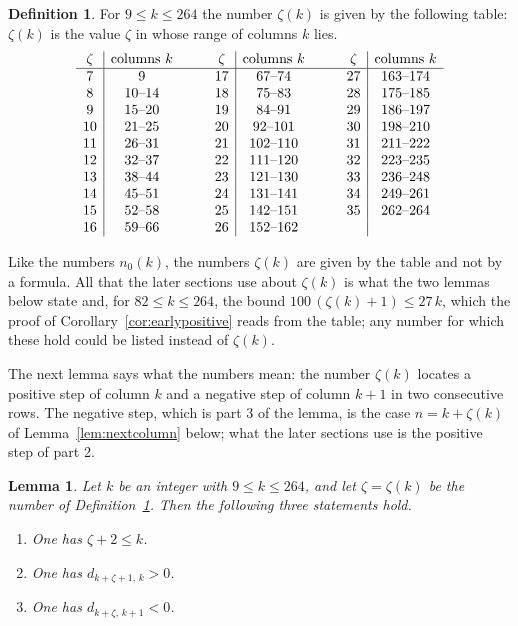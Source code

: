 \documentclass{amsart}
\newtheorem{lemma}[theorem]{Lemma}
\theoremstyle{definition}
\newtheorem{definition}[theorem]{Definition}
\theoremstyle{remark}
\numberwithin{equation}{section}
\begin{document}
\begin{definition}\label{def:zeta}
For $9\le k\le264$ the number $\zeta(k)$ is given by the following table:
$\zeta(k)$ is the value $\zeta$ in whose range of columns $k$ lies.
\[
\begin{array}{c|c@{\qquad\quad}c|c@{\qquad\quad}c|c}
\zeta & \text{columns $k$} & \zeta & \text{columns $k$} & \zeta
 & \text{columns $k$}\\
\hline
7 & 9 & 17 & 67\text{--}74 & 27 & 163\text{--}174\\
8 & 10\text{--}14 & 18 & 75\text{--}83 & 28 & 175\text{--}185\\
9 & 15\text{--}20 & 19 & 84\text{--}91 & 29 & 186\text{--}197\\
10 & 21\text{--}25 & 20 & 92\text{--}101 & 30 & 198\text{--}210\\
11 & 26\text{--}31 & 21 & 102\text{--}110 & 31 & 211\text{--}222\\
12 & 32\text{--}37 & 22 & 111\text{--}120 & 32 & 223\text{--}235\\
13 & 38\text{--}44 & 23 & 121\text{--}130 & 33 & 236\text{--}248\\
14 & 45\text{--}51 & 24 & 131\text{--}141 & 34 & 249\text{--}261\\
15 & 52\text{--}58 & 25 & 142\text{--}151 & 35 & 262\text{--}264\\
16 & 59\text{--}66 & 26 & 152\text{--}162 & &
\end{array}
\]
\end{definition}

Like the numbers $n_0(k)$, the numbers $\zeta(k)$ are given by the
table and not by a formula. All that the later sections use about
$\zeta(k)$ is what the two lemmas below state and, for $82\le k\le264$, the
bound $100\,(\zeta(k)+1)\le27\,k$, which the proof of
Corollary~\ref{cor:earlypositive} reads from the table; any number for
which these hold could be listed instead of $\zeta(k)$.

The next lemma
says what the numbers mean: the number $\zeta(k)$
locates a positive step of column $k$ and a negative step of column $k+1$
in two consecutive rows. The negative step, which is part 3 of the lemma,
is the case $n=k+\zeta(k)$ of Lemma~\ref{lem:nextcolumn} below; what the
later sections use is the positive step of part 2.

\begin{lemma}\label{lem:signpair}
Let $k$ be an integer with $9\le k\le264$, and let $\zeta=\zeta(k)$ be the
number of Definition~\ref{def:zeta}. Then the following three statements
hold.
\begin{enumerate}
\item One has $\zeta+2\le k$.
\item One has $d_{k+\zeta+1,\,k}>0$.
\item One has $d_{k+\zeta,\,k+1}<0$.
\end{enumerate}
\end{lemma}
\end{document}
